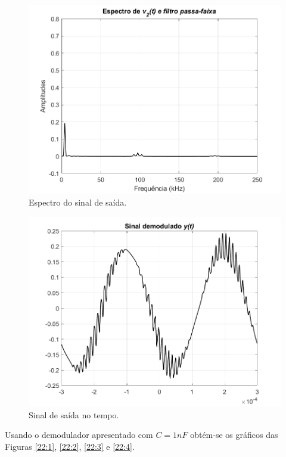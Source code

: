 \documentclass[a4paper,12pt,oneside,openany,table,xcdraw]{article}
\begin{document}
\vspace{0.3cm}
\begin{figure}[H]
\centering
\includegraphics[width=\textwidth]{ex2_espectro_saida}
\caption{Espectro do sinal de saída.}
\label{2:3}
\end{figure}

\vspace{0.3cm}
\begin{figure}[H]
\centering
\includegraphics[width=\textwidth]{ex2_saida}
\caption{Sinal de saída no tempo.}
\label{2:4}
\end{figure}

\newpage
Usando o demodulador apresentado com $C=1nF$ obtém-se os gráficos das Figuras \ref{22:1}, \ref{22:2}, \ref{22:3} e  \ref{22:4}.
\end{document}
